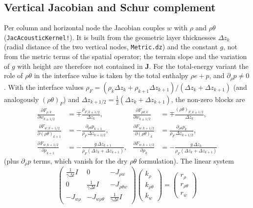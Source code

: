 \documentclass[11pt,a4paper]{article}
\newcommand{\code}[1]{\texttt{#1}}
\begin{document}
\subsection{Vertical Jacobian and Schur complement}
\label{sec:jac}

Per column and horizontal node the Jacobian couples $w$ with $\rho$ and
$\rho\theta$ (\code{JacAcousticKernel!}). It is built from the geometric
layer thicknesses $\Delta z_k$ (radial distance of the two vertical nodes,
\code{Metric.dz}) and the constant $g$, not from the metric terms of the
spatial operator; the terrain slope and the variation of $g$ with height are
therefore not contained in $\mathbf J$. For the total-energy variant the
role of $\rho\theta$ in the interface value is taken by the total enthalpy
$\rho e + p$, and $\partial_\rho p \neq 0$.
With the interface values
$\rho_F = (\rho_k\Delta z_k + \rho_{k+1}\Delta z_{k+1})/(\Delta z_k+\Delta z_{k+1})$
(and analogously $(\rho\theta)_F$) and $\Delta z_{k+1/2} =
\tfrac12(\Delta z_k + \Delta z_{k+1})$, the non-zero blocks are
\begin{align}
  \frac{\partial F_{\rho,k}}{\partial w_{k\pm1/2}} &= \mp\frac{\rho_{F,k\pm1/2}}{\Delta z_k},
  &
  \frac{\partial F_{\rho\theta,k}}{\partial w_{k\pm1/2}} &=
    \mp\frac{(\rho\theta)_{F,k\pm1/2}}{\Delta z_k},\\
  \frac{\partial F_{w,k+1/2}}{\partial (\rho\theta)_{k+1}} &=
    -\frac{\partial_{\rho\theta}p_{k+1}}{\rho_F\,\Delta z_{k+1/2}},
  &
  \frac{\partial F_{w,k+1/2}}{\partial (\rho\theta)_{k}} &=
    \frac{\partial_{\rho\theta}p_{k}}{\rho_F\,\Delta z_{k+1/2}},\\
  \frac{\partial F_{w,k+1/2}}{\partial \rho_{k+1}} &=
    -\frac{g\,\Delta z_{k+1}}{\rho_F(\Delta z_k+\Delta z_{k+1})},
  &
  \frac{\partial F_{w,k+1/2}}{\partial \rho_{k}} &=
    -\frac{g\,\Delta z_{k}}{\rho_F(\Delta z_k+\Delta z_{k+1})}
\end{align}
(plus $\partial_\rho p$ terms, which vanish for the dry $\rho\theta$
formulation). The linear system
\begin{equation}
  \begin{pmatrix}
    \tfrac1{\gamma\Delta t}I & 0 & -J_{\rho w}\\
    0 & \tfrac1{\gamma\Delta t}I & -J_{\rho\theta w}\\
    -J_{w\rho} & -J_{w\rho\theta} & \tfrac1{\gamma\Delta t}I
  \end{pmatrix}
  \begin{pmatrix} k_\rho\\ k_{\rho\theta}\\ k_w\end{pmatrix}
  =
  \begin{pmatrix} r_\rho\\ r_{\rho\theta}\\ r_w\end{pmatrix}
\end{equation}
\end{document}
